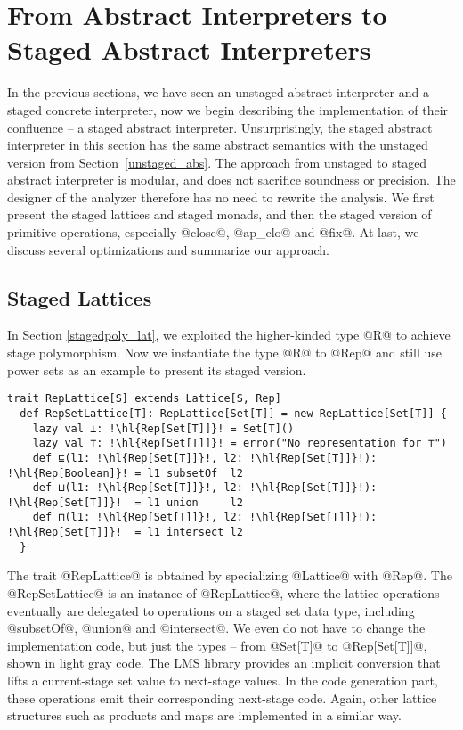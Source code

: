 \section{From Abstract Interpreters to Staged Abstract Interpreters} \label{sai}

In the previous sections, we have seen an unstaged abstract interpreter and a
staged concrete interpreter, now we begin describing the implementation of their
confluence -- a staged abstract interpreter.
Unsurprisingly, the staged abstract interpreter in this section has the same
abstract semantics with the unstaged version from Section~\ref{unstaged_abs}.
The approach from unstaged to staged abstract interpreter is modular,
and does not sacrifice soundness or precision. The designer of the
analyzer therefore has no need to rewrite the analysis. We first present the
staged lattices and staged monads, and then the staged version of primitive
operations, especially @close@, @ap_clo@ and @fix@. At last, we discuss several
optimizations and summarize our approach.

\subsection{Staged Lattices}

In Section \ref{stagedpoly_lat}, we exploited the higher-kinded type @R@ to
achieve stage polymorphism. Now we instantiate the type @R@ to @Rep@ and
still use power sets as an example to present its staged version.

\begin{lstlisting}[escapechar=!]
  trait RepLattice[S] extends Lattice[S, Rep]
  def RepSetLattice[T]: RepLattice[Set[T]] = new RepLattice[Set[T]] {
    lazy val ⊥: !\hl{Rep[Set[T]]}! = Set[T]()
    lazy val ⊤: !\hl{Rep[Set[T]]}! = error("No representation for ⊤")
    def ⊑(l1: !\hl{Rep[Set[T]]}!, l2: !\hl{Rep[Set[T]]}!): !\hl{Rep[Boolean]}! = l1 subsetOf  l2
    def ⊔(l1: !\hl{Rep[Set[T]]}!, l2: !\hl{Rep[Set[T]]}!): !\hl{Rep[Set[T]]}!  = l1 union     l2
    def ⊓(l1: !\hl{Rep[Set[T]]}!, l2: !\hl{Rep[Set[T]]}!): !\hl{Rep[Set[T]]}!  = l1 intersect l2
  }
\end{lstlisting}

The trait @RepLattice@ is obtained by specializing @Lattice@ with @Rep@.
The @RepSetLattice@ is an instance of @RepLattice@, where the lattice operations
eventually are delegated to operations on a staged set data type, including
@subsetOf@, @union@ and @intersect@. We even do not have to change the
implementation code, but just the types -- from @Set[T]@ to @Rep[Set[T]]@, shown
in light gray code. The LMS library provides an implicit conversion that lifts a
current-stage set value to next-stage values. In the code generation part, these
operations emit their corresponding next-stage code. Again, other lattice
structures such as products and maps are implemented in a similar way.

